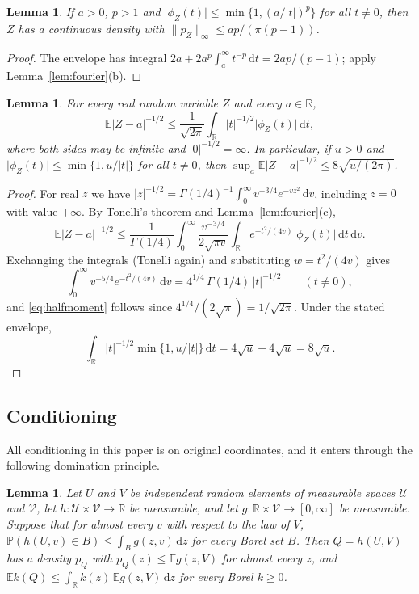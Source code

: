 \documentclass[11pt]{amsart}
\numberwithin{equation}{section}
\newtheorem{lemma}[theorem]{Lemma}
\theoremstyle{definition}
\theoremstyle{remark}
\newcommand{\R}{\mathbb R}
\newcommand{\E}{\mathbb E}
\newcommand{\PP}{\mathbb P}
\newcommand{\1}{\mathbf 1}
\newcommand{\dd}{\,\mathrm d}
\newcommand{\norm}[1]{\lVert #1\rVert}
\newcommand{\abs}[1]{\lvert #1\rvert}
\begin{document}
\begin{lemma}\label{lem:envelope}
If $a>0$, $p>1$ and $\abs{\phi_Z(t)}\le\min\{1,(a/\abs t)^p\}$ for all $t\ne0$, then $Z$ has a continuous density with $\norm{p_Z}_\infty\le ap/(\pi(p-1))$.
\end{lemma}

\begin{proof}
The envelope has integral $2a+2a^p\int_a^\infty t^{-p}\dd t=2ap/(p-1)$; apply Lemma~\ref{lem:fourier}(b).
\end{proof}

\begin{lemma}\label{lem:halfmoment}
For every real random variable $Z$ and every $a\in\R$,
\begin{equation}\label{eq:halfmoment}
\E\abs{Z-a}^{-1/2}\le\frac1{\sqrt{2\pi}}\int_\R\abs t^{-1/2}\abs{\phi_Z(t)}\dd t,
\end{equation}
where both sides may be infinite and $\abs0^{-1/2}=\infty$. In particular, if $u>0$ and $\abs{\phi_Z(t)}\le\min\{1,u/\abs t\}$ for all $t\ne0$, then $\sup_a\E\abs{Z-a}^{-1/2}\le8\sqrt{u/(2\pi)}$.
\end{lemma}

\begin{proof}
For real $z$ we have $\abs z^{-1/2}=\Gamma(1/4)^{-1}\int_0^\infty v^{-3/4}e^{-vz^2}\dd v$, including $z=0$ with value $+\infty$. By Tonelli's theorem and Lemma~\ref{lem:fourier}(c),
\[
\E\abs{Z-a}^{-1/2}\le\frac{1}{\Gamma(1/4)}\int_0^\infty\frac{v^{-3/4}}{2\sqrt{\pi v}}\int_\R e^{-t^2/(4v)}\abs{\phi_Z(t)}\dd t\dd v .
\]
Exchanging the integrals (Tonelli again) and substituting $w=t^2/(4v)$ gives
\[
\int_0^\infty v^{-5/4}e^{-t^2/(4v)}\dd v=4^{1/4}\,\Gamma(1/4)\,\abs t^{-1/2}\qquad(t\ne0),
\]
and \eqref{eq:halfmoment} follows since $4^{1/4}/(2\sqrt\pi)=1/\sqrt{2\pi}$. Under the stated envelope,
\[
\int_\R\abs t^{-1/2}\min\{1,u/\abs t\}\dd t=4\sqrt u+4\sqrt u=8\sqrt u .
\]
\end{proof}

\subsection{Conditioning}
All conditioning in this paper is on original coordinates, and it enters through the following domination principle.

\begin{lemma}\label{lem:condition}
Let $U$ and $V$ be independent random elements of measurable spaces $\mathcal U$ and $\mathcal V$, let $h:\mathcal U\times\mathcal V\to\R$ be measurable, and let $g:\R\times\mathcal V\to[0,\infty]$ be measurable. Suppose that for almost every $v$ with respect to the law of $V$, $\PP(h(U,v)\in B)\le\int_Bg(z,v)\dd z$ for every Borel set $B$. Then $Q=h(U,V)$ has a density $p_Q$ with $p_Q(z)\le\E g(z,V)$ for almost every $z$, and $\E k(Q)\le\int_\R k(z)\,\E g(z,V)\dd z$ for every Borel $k\ge0$.
\end{lemma}
\end{document}

